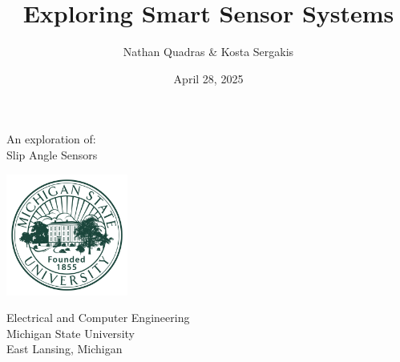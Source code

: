 \documentclass[12pt]{article}
\title{Exploring Smart Sensor Systems}
\author{Nathan Quadras \& Kosta Sergakis}
\date{April 28, 2025}
\makeatletter
\let\runauthor\@author
\let\runtitle\@title
\let\rundate\@date
\makeatother
\begin{document}
    
    \begin{titlepage}
        \begin{center}
            \vspace*{1.5cm}
            
            \textbf{\runtitle}
            
            \vspace{1cm}
            
            An exploration of:\\
            \vspace{0.25cm}
            Slip Angle Sensors
                
            \vspace{1cm}
            
            \textbf{\runauthor}
            
            \vfill  
            
            \vspace{1cm}

            \includegraphics[width=0.3\textwidth]{resources/michigan-state-logo-png-transparent.png}
                
            Electrical and Computer Engineering\\
            Michigan State University\\
            East Lansing, Michigan\\
            \rundate
                
        \end{center}
    
    \end{titlepage}



    \setcounter{secnumdepth}{0} %
    
\end{document}
